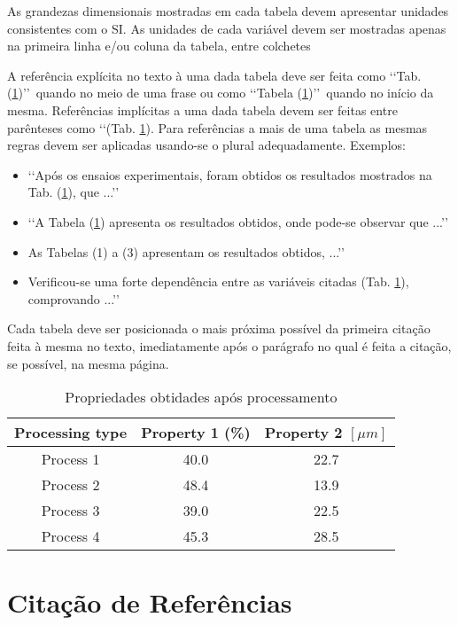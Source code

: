 As grandezas dimensionais mostradas em cada tabela devem apresentar unidades 
consistentes com o SI. As unidades de cada variável devem ser mostradas apenas 
na primeira linha e/ou coluna da tabela, entre colchetes 

A referência explícita no texto à uma dada tabela deve ser feita como 
\lq\lq Tab. (\ref{tab01})\rq\rq\ quando no meio de uma frase ou como 
\lq\lq Tabela (\ref{tab01})\rq\rq\ quando no início da mesma. Referências 
implícitas a uma dada tabela devem ser feitas entre parênteses como 
\lq\lq (Tab. \ref{tab01}). Para referências a mais de uma tabela as mesmas 
regras devem ser aplicadas usando-se o plural adequadamente. Exemplos:
\begin{itemize}
	\item \lq\lq Após os ensaios experimentais, foram obtidos os resultados 
	mostrados na Tab. (\ref{tab01}), que ...\rq\rq
	\item \lq\lq A Tabela (\ref{tab01}) apresenta os resultados obtidos, onde 
	pode-se observar que ...\rq\rq
	\item As Tabelas (1) a (3) apresentam os resultados obtidos, ...\rq\rq
	\item Verificou-se uma forte dependência entre as variáveis citadas 
	(Tab. \ref{tab01}), comprovando ...\rq\rq
\end{itemize}

Cada tabela deve ser posicionada o mais próxima possível da primeira citação 
feita à mesma no texto, imediatamente após o parágrafo no qual é feita a 
citação, se possível, na mesma página.

\begin{table}[h]
	\centering
	\label{tab01}
	
	\begin{tabular}{ccc}
		\toprule
		\textbf{Processing type} & \textbf{Property 1} (\%) & 
		\textbf{Property 2} $[\mu m]$ \\
		\midrule
		Process 1 & 40.0 & 22.7 \\
		Process 2 & 48.4 & 13.9 \\
		Process 3 & 39.0 & 22.5 \\
		Process 4 & 45.3 & 28.5 \\
		\bottomrule
	\end{tabular}

	\caption{Propriedades obtidades após processamento}
\end{table}

\section{Citação de Referências}

